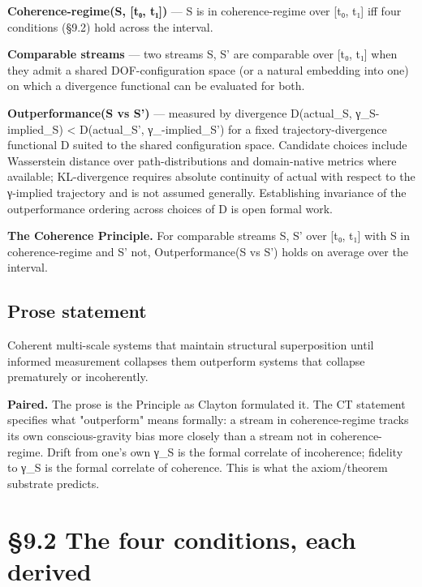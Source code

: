 \documentclass[11pt, openany]{book}
\renewenvironment{quote}{\begin{quoting}}{\end{quoting}}
\newcommand{\sectionbreak}{\clearpage}
\begin{document}
\begin{quote}
\textbf{Coherence-regime(S, [t₀, t₁])} --- S is in coherence-regime over [t₀, t₁] iff four conditions (§9.2) hold across the interval.

\textbf{Comparable streams} --- two streams S, S' are comparable over [t₀, t₁] when they admit a shared DOF-configuration space (or a natural embedding into one) on which a divergence functional can be evaluated for both.

\textbf{Outperformance(S vs S')} --- measured by divergence D(actual\_\allowbreak{}S, γ\_\allowbreak{}S-implied\_\allowbreak{}S) < D(actual\_\allowbreak{}S', γ\_-implied\_\allowbreak{}S') for a fixed trajectory-divergence functional D suited to the shared configuration space. Candidate choices include Wasserstein distance over path-distributions and domain-native metrics where available; KL-divergence requires absolute continuity of actual with respect to the γ-implied trajectory and is not assumed generally. Establishing invariance of the outperformance ordering across choices of D is open formal work.
\end{quote}

\textbf{The Coherence Principle.} For comparable streams S, S' over [t₀, t₁] with S in coherence-regime and S' not, Outperformance(S vs S') holds on average over the interval.

\subsection{Prose statement}

Coherent multi-scale systems that maintain structural superposition until informed measurement collapses them outperform systems that collapse prematurely or incoherently.

\textbf{Paired.} The prose is the Principle as Clayton formulated it. The CT statement specifies what "outperform" means formally: a stream in coherence-regime tracks its own conscious-gravity bias more closely than a stream not in coherence-regime. Drift from one's own γ\_\allowbreak{}S is the formal correlate of incoherence; fidelity to γ\_\allowbreak{}S is the formal correlate of coherence. This is what the axiom/theorem substrate predicts.

\sectionbreak

\section{§9.2 The four conditions, each derived}
\end{document}
